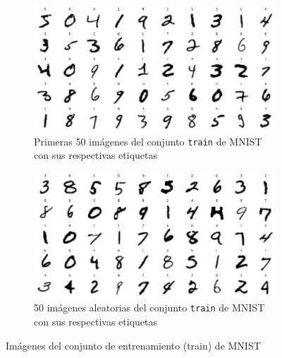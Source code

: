 \begin{figure}[h!]
    \centering
    \begin{subfigure}[b]{0.45\textwidth}
        \centering
        \includegraphics[width=\textwidth]{images/mnist/mnist_train_first50.png}
        \caption{Primeras 50 imágenes del conjunto \texttt{train} de MNIST con sus respectivas etiquetas}
        \label{mnist3}
    \end{subfigure}
    \hspace{1cm}
    \begin{subfigure}[b]{0.45\textwidth}
        \centering
        \includegraphics[width=\textwidth]{images/mnist/mnist_train_random.png}
        \caption{50 imágenes aleatorias del conjunto \texttt{train} de MNIST con sus respectivas etiquetas}
        \label{mnist4}
    \end{subfigure}
    \caption{Imágenes del conjunto de entrenamiento (train) de MNIST}
    \label{mnist_}
\end{figure}

